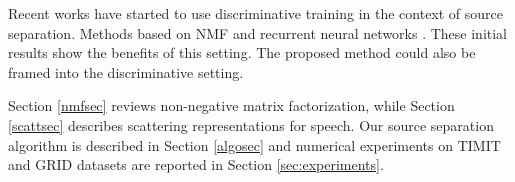 Recent works have started to use discriminative training in the context of source separation.
Methods based on NMF \cite{weninger2014discriminative,sprechmann2014supervised} and recurrent neural networks \cite{merl,Huang_DNN_Separation_ICASSP2014}.
These initial results show the benefits of this setting. The proposed method could also be framed into
the discriminative setting.

Section \ref{nmfsec} reviews non-negative matrix factorization, while Section \ref{scattsec} describes scattering 
representations for speech. Our source separation algorithm is described in Section \ref{algosec} and 
numerical experiments on TIMIT and GRID datasets are reported in Section \ref{sec:experiments}.




